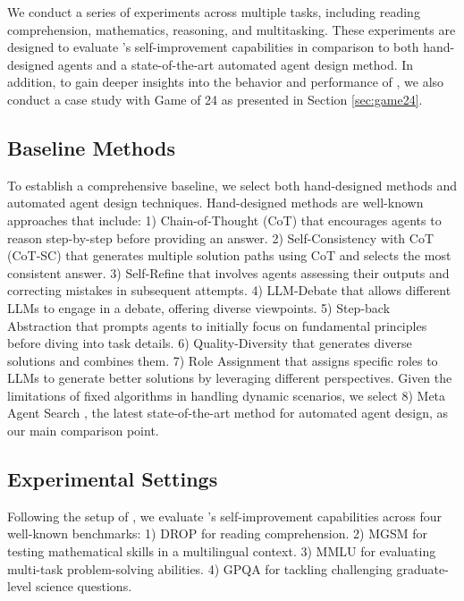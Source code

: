 We conduct a series of experiments across multiple tasks, including reading comprehension, mathematics, reasoning, and multitasking. These experiments are designed to evaluate \framework{}’s self-improvement capabilities in comparison to both hand-designed agents and a state-of-the-art automated agent design method.
In addition, to gain deeper insights into the behavior and performance of \framework, we also conduct a case study with Game of 24 as presented in Section \ref{sec:game24}.


\subsection{Baseline Methods}
To establish a comprehensive baseline, we select both hand-designed methods and automated agent design techniques. Hand-designed methods are well-known approaches that include:
1) Chain-of-Thought (CoT) \citep{wei2022chain} that encourages agents to reason step-by-step before providing an answer.
2) Self-Consistency with CoT (CoT-SC) \citep{wang2023selfconsistencyimproveschainthought} that generates multiple solution paths using CoT and selects the most consistent answer.
3) Self-Refine \citep{madaan2024self} that involves agents assessing their outputs and correcting mistakes in subsequent attempts.
4) LLM-Debate \citep{du2023improvingfactualityreasoninglanguage} that allows different LLMs to engage in a debate, offering diverse viewpoints.
5) Step-back Abstraction \citep{zheng2024stepbackevokingreasoning} that prompts agents to initially focus on fundamental principles before diving into task details.
6) Quality-Diversity \citep{lu2024aiscientistfullyautomated} that generates diverse solutions and combines them.
7) Role Assignment \citep{xu2023expertpromptinginstructinglargelanguage} that assigns specific roles to LLMs to generate better solutions by leveraging different perspectives.
Given the limitations of fixed algorithms in handling dynamic scenarios, we select 8) Meta Agent Search \citep{hu2024automated}, the latest state-of-the-art method for automated agent design, as our main comparison point. 

\subsection{Experimental Settings}
Following the setup of \citet{hu2024automated}, we evaluate \framework's self-improvement capabilities across four well-known benchmarks:
1) DROP \citep{dua2019dropreadingcomprehensionbenchmark} for reading comprehension.
2) MGSM \citep{shi2022languagemodelsmultilingualchainofthought} for testing mathematical skills in a multilingual context.
3) MMLU \citep{hendrycks2021measuringmassivemultitasklanguage} for evaluating multi-task problem-solving abilities.
4) GPQA \citep{rein2023gpqagraduatelevelgoogleproofqa} for tackling challenging graduate-level science questions.


